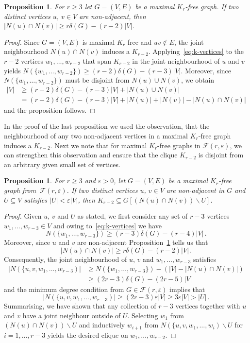 \documentclass[reqno, 12pt]{amsart}
\theoremstyle{plain}
\newtheorem{prop}[thm]{Proposition}
\theoremstyle{definition}
\let\eps=\varepsilon
\let\setminus=\smallsetminus
\begin{document}
\begin{prop}\label{prop:2nonadj}
	For $r\geq3$ let $G=(V,E)$ be a maximal $K_r$-free graph.
	If two distinct vertices $u$, $v\in V$ are non-adjacent, then $|N(u)\cap N(v)|\geq r\delta(G)-(r-2)|V|$.
\end{prop}
\begin{proof}
	Since $G=(V,E)$ is maximal $K_r$-free and $uv\not\in E$, the joint neighbourhood $N(u)\cap N(v)$ induces a
	$K_{r-2}$. Applying~\eqref{eq:k-vertices} to the $r-2$  vertices $w_1,\dots,w_{r-2}$ that span $K_{r-2}$ 
	in the joint neighbourhood of $u$ and $v$ yields $N(\{w_1,\dots,w_{r-2}\})\geq (r-2)\delta(G)-(r-3)|V|$.
	Moreover, since  $N(\{w_1,\dots,w_{r-2}\})$ must be disjoint from $N(u)\cup N(v)$, we obtain
	\begin{align*}
	|V| &\geq(r-2)\delta(G)-(r-3)|V| + |N(u)\cup N(v)| \\
		&= (r-2)\delta(G)-(r-3)|V| + |N(u)| + |N(v)|- |N(u)\cap N(v)| 
	\end{align*}
	and the proposition follows.
\end{proof}

In the proof of the last proposition we used the observation, that the neighbourhood 
of any  two non-adjacent vertices in a maximal $K_r$-free graph induces a $K_{r-2}$.
Next we note that for maximal $K_r$-free graphs in ${{\mathcal F}}(r,\eps)$, we can strengthen 
this observation and ensure that the clique $K_{r-2}$ is disjoint from an arbitrary given small 
set of vertices.

\begin{prop}\label{prop:K_r-2}
	For $r\geq 3$ and $\eps>0$,
	let $G=(V,E)$ be a maximal $K_r$-free graph from~${{\mathcal F}}(r,\eps)$.
	If two distinct vertices $u$, $v\in V$ are non-adjacent in $G$ and $U\subseteq V$ satisfies $|U|<\eps |V|$, 
	then $K_{r-2}\subseteq G[(N(u)\cap N(v))\setminus U]$.
\end{prop}

\begin{proof}
	Given $u$, $v$ and $U$ as stated, we first consider any set of $r-3$ vertices $w_1,\dots,w_{r-3}\in V$ and 
	owing to~\eqref{eq:k-vertices} we have 
	\[
		N(\{w_1,\dots,w_{r-3}\})\geq (r-3)\delta(G)-(r-4)|V|\,.
	\]
	Moreover, since $u$ and $v$ are non-adjacent Proposition~\ref{prop:2nonadj} tells us that 
	\[
		|N(u)\cap N(v)|\geq r\delta(G)-(r-2)|V|\,.
	\]
	Consequently, the joint neighbourhood of $u$, $v$ and $w_1,\dots,w_{r-3}$ satisfies 
	\begin{align*}
		|N(\{u,v,w_1,\dots,w_{r-3})| & \geq N(\{w_1,\dots,w_{r-3}\}) - (|V|-|N(u)\cap N(v)|)\\
			& \geq (2r-3)\delta(G) -(2r-5)|V|
	\end{align*}
	and the minimum degree condition from $G\in {{\mathcal F}}(r,\eps)$ implies that 
	\[
		|N(\{u,v,w_1,\dots,w_{r-3})|\geq (2r-3)\eps |V|\geq 3\eps|V| >|U|\,.
	\]
	Summarising, we have shown that any collection of $r-3$ vertices together with $u$ and $v$
	have a joint neighbour outside of $U$. Selecting  
	$w_1$ from $(N(u)\cap N(v))\setminus U$ and inductively $w_{i+1}$
	from $N(\{u,v,w_1,\dots,w_i)\setminus U$
	for $i=1,\dots,r-3$ yields the desired clique on $w_1,\dots,w_{r-2}$.
\end{proof}
\end{document}
